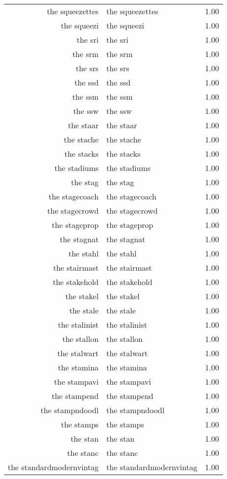 \begin{table}[ht]
\begin{tabular}{rlr}
  the squeezettes & the squeezettes & 1.00 \\ 
  the squeezi & the squeezi & 1.00 \\ 
  the sri & the sri & 1.00 \\ 
  the srm & the srm & 1.00 \\ 
  the srs & the srs & 1.00 \\ 
  the ssd & the ssd & 1.00 \\ 
  the ssm & the ssm & 1.00 \\ 
  the ssw & the ssw & 1.00 \\ 
  the staar & the staar & 1.00 \\ 
  the stache & the stache & 1.00 \\ 
  the stacks & the stacks & 1.00 \\ 
  the stadiums & the stadiums & 1.00 \\ 
  the stag & the stag & 1.00 \\ 
  the stagecoach & the stagecoach & 1.00 \\ 
  the stagecrowd & the stagecrowd & 1.00 \\ 
  the stageprop & the stageprop & 1.00 \\ 
  the stagnat & the stagnat & 1.00 \\ 
  the stahl & the stahl & 1.00 \\ 
  the stairmast & the stairmast & 1.00 \\ 
  the stakehold & the stakehold & 1.00 \\ 
  the stakel & the stakel & 1.00 \\ 
  the stale & the stale & 1.00 \\ 
  the stalinist & the stalinist & 1.00 \\ 
  the stallon & the stallon & 1.00 \\ 
  the stalwart & the stalwart & 1.00 \\ 
  the stamina & the stamina & 1.00 \\ 
  the stampavi & the stampavi & 1.00 \\ 
  the stampend & the stampend & 1.00 \\ 
  the stampndoodl & the stampndoodl & 1.00 \\ 
  the stamps & the stamps & 1.00 \\ 
  the stan & the stan & 1.00 \\ 
  the stanc & the stanc & 1.00 \\ 
  the standardmodernvintag & the standardmodernvintag & 1.00 \\ 

\end{tabular}
\end{table}
